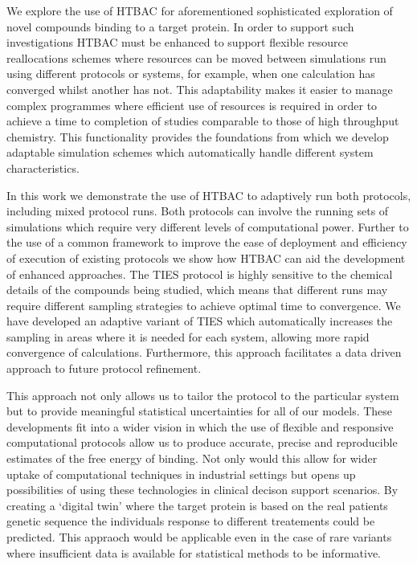 We explore the use of HTBAC for aforementioned sophisticated
exploration of novel compounds binding to a target protein.
In order to support such investigations HTBAC must be enhanced to support
flexible resource reallocations schemes where resources can be moved between
simulations run using different protocols or systems, for example, when one
calculation has converged whilst another has not. This adaptability makes it
easier to manage complex programmes where efficient use of resources is
required in order to achieve a time to completion of studies comparable to
those of high throughput chemistry. This functionality provides the
foundations from which we develop adaptable simulation schemes which
automatically handle different system characteristics.

In this work we demonstrate the use of HTBAC to adaptively run both protocols,
including mixed protocol runs. Both protocols can involve the running sets of
simulations which require very different levels of computational power.
Further to the use of a common framework to improve the ease of deployment and
efficiency of execution of existing protocols we show how HTBAC can aid the
development of enhanced approaches. 
The TIES protocol is highly sensitive to the chemical details of the compounds being studied, which means that different runs may require different sampling strategies to achieve optimal time to convergence. 
We have developed an adaptive variant of TIES which automatically increases the sampling in areas where it is needed for each system, allowing more rapid convergence of calculations. 
Furthermore, this approach facilitates a data driven approach to future
protocol refinement.


This approach not only allows us to tailor the protocol to the particular system but to provide meaningful statistical uncertainties for all of our models.
These developments fit into a wider vision in which the use of flexible and 
responsive computational protocols allow us to produce accurate, precise and 
reproducible estimates of the free energy of binding.
Not only would this allow for wider uptake of computational techniques in industrial settings but opens up possibilities of using these technologies 
in clinical decison support scenarios.
By creating a `digital twin' where the target protein is based on the real patients genetic sequence the individuals response to different treatements could be predicted.
This appraoch would be applicable even in the case of rare variants where insufficient data is available for statistical methods to be informative.

